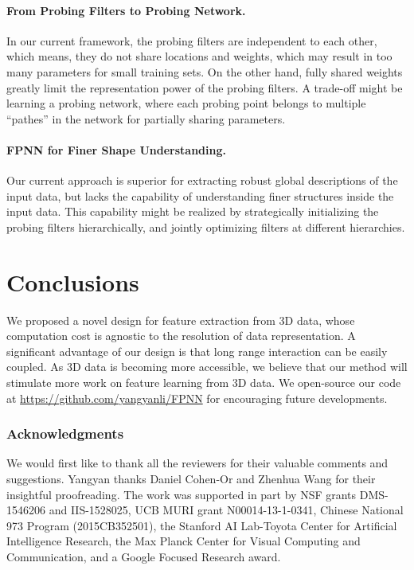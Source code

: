 \documentclass{article}
\begin{document}
\paragraph{From Probing Filters to Probing Network.}
In our current framework, the probing filters are independent to each other, which means, they do not share locations and weights, which may result in too many parameters for small training sets. On the other hand, fully shared weights greatly limit the representation power of the probing filters. A trade-off might be learning a probing network, where each probing point belongs to multiple ``pathes'' in the network for partially sharing parameters.

\paragraph{FPNN for Finer Shape Understanding.}
Our current approach is superior for extracting robust global descriptions of the input data, but lacks the capability of understanding finer structures inside the input data. This capability might be realized by strategically initializing the probing filters hierarchically, and jointly optimizing filters at different hierarchies.
 \vspace{-0.2cm}
\section{Conclusions}
\label{sec:conclusions}

\vspace{-0.2cm}

We proposed a novel design for feature extraction from 3D data, whose computation cost is agnostic to the resolution of data representation. A significant advantage of our design is that long range interaction can be easily coupled. As 3D data is becoming more accessible, we believe that our method will stimulate more work on feature learning from 3D data. We open-source our code at \url{https://github.com/yangyanli/FPNN} for encouraging future developments. \vspace{-0.2cm}
\subsubsection*{Acknowledgments}
\vspace{-0.2cm}
We would first like to thank all the reviewers for their valuable comments and suggestions. Yangyan thanks Daniel Cohen-Or and Zhenhua Wang for their insightful proofreading. The work was supported in part by NSF grants DMS-1546206 and IIS-1528025, UCB MURI grant N00014-13-1-0341, Chinese National 973 Program (2015CB352501), the Stanford AI Lab-Toyota Center for Artificial Intelligence Research, the Max Planck Center for Visual Computing and Communication, and a Google Focused Research award.



\end{document}
